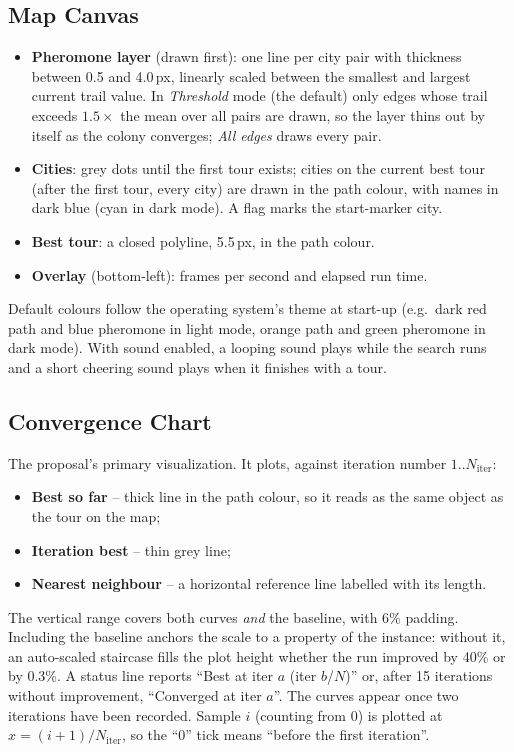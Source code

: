 \documentclass[11pt,a4paper]{article}
\begin{document}
\subsection{Map Canvas}
\begin{itemize}
  \item \textbf{Pheromone layer} (drawn first): one line per city pair with thickness between 0.5 and 4.0\,px,
        linearly scaled between the smallest and largest current trail value. In \emph{Threshold} mode (the
        default) only edges whose trail exceeds $1.5\times$ the mean over all pairs are drawn, so the layer
        thins out by itself as the colony converges; \emph{All edges} draws every pair.
  \item \textbf{Cities}: grey dots until the first tour exists; cities on the current best tour (after the
        first tour, every city) are drawn in the path colour, with names in dark blue (cyan in dark mode).
        A flag marks the start-marker city.
  \item \textbf{Best tour}: a closed polyline, 5.5\,px, in the path colour.
  \item \textbf{Overlay} (bottom-left): frames per second and elapsed run time.
\end{itemize}
Default colours follow the operating system's theme at start-up (e.g.\ dark red path and blue pheromone
in light mode, orange path and green pheromone in dark mode). With sound enabled, a looping sound plays
while the search runs and a short cheering sound plays when it finishes with a tour.

\subsection{Convergence Chart}
The proposal's primary visualization. It plots, against iteration number $1..N_{\text{iter}}$:
\begin{itemize}
  \item \textbf{Best so far} -- thick line in the path colour, so it reads as the same object as the tour on
        the map;
  \item \textbf{Iteration best} -- thin grey line;
  \item \textbf{Nearest neighbour} -- a horizontal reference line labelled with its length.
\end{itemize}
The vertical range covers both curves \emph{and} the baseline, with 6\% padding. Including the baseline
anchors the scale to a property of the instance: without it, an auto-scaled staircase fills the plot
height whether the run improved by 40\% or by 0.3\%. A status line reports ``Best at iter $a$ (iter $b$/$N$)''
or, after 15 iterations without improvement, ``Converged at iter $a$''. The curves appear once two iterations
have been recorded. Sample $i$ (counting from 0) is plotted at $x=(i+1)/N_{\text{iter}}$, so the ``0'' tick
means ``before the first iteration''.
\end{document}
